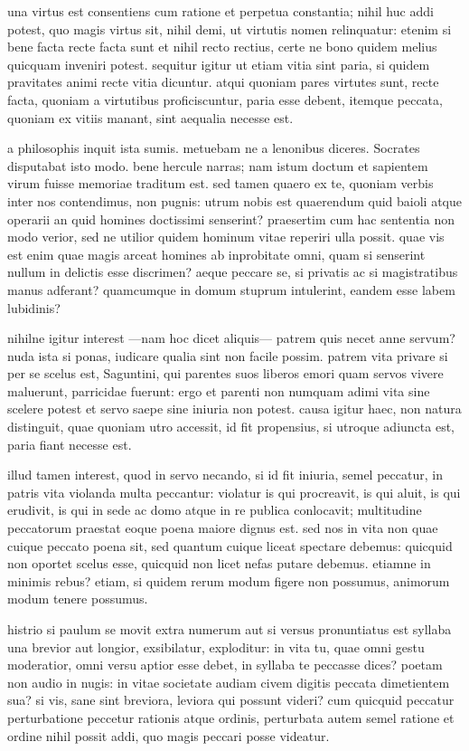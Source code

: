  una virtus est consentiens cum ratione et perpetua constantia; nihil huc addi potest, quo magis virtus sit, nihil demi, ut virtutis nomen relinquatur: etenim si bene facta recte facta sunt et nihil recto rectius, certe ne bono quidem melius quicquam inveniri potest. sequitur igitur ut etiam vitia sint paria, si quidem pravitates animi recte vitia dicuntur. atqui quoniam pares virtutes sunt, recte facta, quoniam a virtutibus proficiscuntur, paria esse debent, itemque peccata, quoniam ex vitiis manant, sint aequalia necesse est.

 a philosophis inquit ista sumis. metuebam ne a lenonibus diceres. Socrates disputabat isto modo. bene hercule narras; nam istum doctum et sapientem virum fuisse memoriae traditum est. sed tamen quaero ex te, quoniam verbis inter nos contendimus, non pugnis: utrum nobis est quaerendum quid baioli atque operarii an quid homines doctissimi senserint? praesertim cum hac sententia non modo verior, sed ne utilior quidem hominum vitae reperiri ulla possit. quae vis est enim quae magis arceat homines ab inprobitate omni, quam si senserint nullum in delictis esse discrimen? aeque peccare se, si privatis ac si magistratibus manus adferant? quamcumque in domum stuprum intulerint, eandem esse labem lubidinis?

 nihilne igitur interest —nam hoc dicet aliquis— patrem quis necet anne servum? nuda ista si ponas, iudicare qualia sint non facile possim. patrem vita privare si per se scelus est, Saguntini, qui parentes suos liberos emori quam servos vivere maluerunt, parricidae fuerunt: ergo et parenti non numquam adimi vita sine scelere potest et servo saepe sine iniuria non potest. causa igitur haec, non natura distinguit, quae quoniam utro accessit, id fit propensius, si utroque adiuncta est, paria fiant necesse est.

 illud tamen interest, quod in servo necando, si id fit iniuria, semel peccatur, in patris vita violanda multa peccantur: violatur is qui procreavit, is qui aluit, is qui erudivit, is qui in sede ac domo atque in re publica conlocavit; multitudine peccatorum praestat eoque poena maiore dignus est. sed nos in vita non quae cuique peccato poena sit, sed quantum cuique liceat spectare debemus: quicquid non oportet scelus esse, quicquid non licet nefas putare debemus. etiamne in minimis rebus? etiam, si quidem rerum modum figere non possumus, animorum modum tenere possumus.

 histrio si paulum se movit extra numerum aut si versus pronuntiatus est syllaba una brevior aut longior, exsibilatur, exploditur: in vita tu, quae omni gestu moderatior, omni versu aptior esse debet, in syllaba te peccasse dices? poetam non audio in nugis: in vitae societate audiam civem digitis peccata dimetientem sua? si vis, sane sint breviora, leviora qui possunt videri? cum quicquid peccatur perturbatione peccetur rationis atque ordinis, perturbata autem semel ratione et ordine nihil possit addi, quo magis peccari posse videatur.

